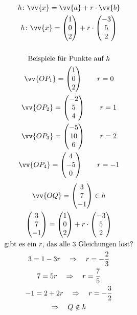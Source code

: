\begin{gather*}
  h \colon \vv{x} = \vv{a} + r \cdot \vv{b} \\
  h \colon \vv{x} = \begin{pmatrix}1 \\ 0 \\ 2\end{pmatrix} + r \cdot \begin{pmatrix}-3 \\ 5 \\ 2\end{pmatrix} \\\\
  \text{Beispiele für Punkte auf $h$} \\
  \vv{OP_1} = \begin{pmatrix}1 \\ 0 \\ 2\end{pmatrix} \qquad r = 0 \\
  \vv{OP_2} = \begin{pmatrix}-2 \\ 5 \\ 4\end{pmatrix} \qquad r = 1 \\
  \vv{OP_3} = \begin{pmatrix}-5 \\ 10 \\ 6\end{pmatrix} \qquad r = 2 \\
  \vv{OP_4} = \begin{pmatrix}4 \\ -5 \\ 0\end{pmatrix} \qquad r = -1
\end{gather*}
\begin{gather*}
  \vv{OQ} = \begin{pmatrix}3 \\ 7 \\ -1\end{pmatrix} \in h \\
  \begin{pmatrix}3 \\ 7 \\ -1\end{pmatrix} = \begin{pmatrix}1 \\ 0 \\ 2\end{pmatrix} + r \cdot \begin{pmatrix}-3 \\ 5 \\ 2\end{pmatrix} \\
  \text{gibt es ein $r$, das alle 3 Gleichungen löst?} \\
  3 = 1 - 3r \quad\Rightarrow\quad r = -\frac{2}{3} \\
  7 = 5r \quad\Rightarrow\quad r = \frac{7}{5} \\
  -1 = 2 + 2r \quad\Rightarrow\quad r = -\frac{3}{2} \\
  \Rightarrow\quad Q \notin h
\end{gather*}
